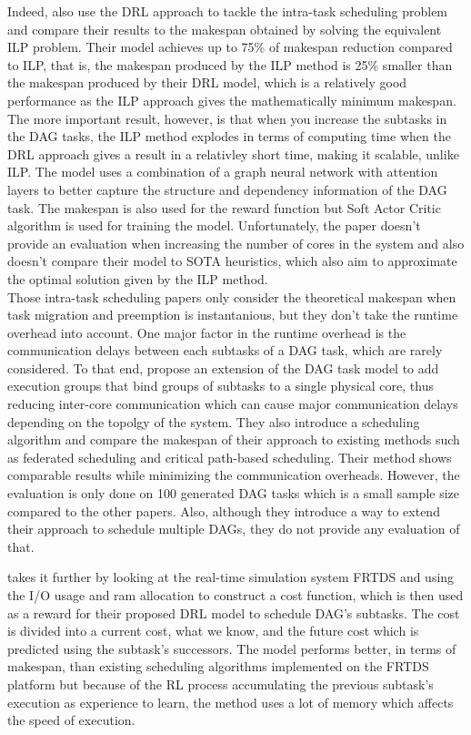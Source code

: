 Indeed, \cite{Zhao2024GATDRLmodel} also 
use the DRL approach to tackle the intra-task scheduling 
problem and compare their results to the makespan
obtained by solving the equivalent ILP problem.
Their model achieves up to 75\% of makespan 
reduction compared to ILP, that is, the makespan 
produced by the ILP method is 25\% smaller than the 
makespan produced by their DRL model,
which is a relatively good performance as 
the ILP approach gives the mathematically minimum makespan.
The more important result, however,
is that when you increase the subtasks in the DAG tasks,
the ILP method explodes in terms of computing
time when the DRL approach gives a result in a relativley short time,
making it scalable, unlike ILP.
The model uses a combination of a graph neural network 
with attention layers to better capture 
the structure and dependency information of the DAG task.
The makespan is also used for the reward function but 
Soft Actor Critic algorithm is used for training the model. 
Unfortunately, the paper doesn't provide 
an evaluation when increasing the number of cores 
in the system and also doesn't compare their model 
to SOTA heuristics, which also aim to approximate 
the optimal solution given by the ILP method.\\

Those intra-task scheduling papers only consider the theoretical
makespan when task migration and preemption 
is instantanious, but they don't take the runtime overhead into account.
One major factor in the runtime overhead is the communication 
delays between each subtasks of a DAG task, which are rarely considered.
To that end, \cite{Shi2024DagExecGroups}
propose an extension of the DAG task model to add 
execution groups that bind groups of subtasks
to a single physical core, thus reducing 
inter-core communication which can cause major
communication delays depending on the topolgy of the system.
They also introduce a scheduling algorithm 
and compare the makespan of their approach to existing methods
such as federated scheduling and critical path-based scheduling.
Their method shows comparable results while minimizing 
the communication overheads.
However, the evaluation is only done on 100 generated 
DAG tasks which is a small sample size compared to the other papers\cite{Zhao2022DAGsched}\cite{He2019DagIntra}.
Also, although they introduce a way to extend their approach to schedule
multiple DAGs, they do not provide any evaluation of that.

\cite{GuanFRTDS2020RL} takes it further by looking 
at the real-time simulation system FRTDS
and using the I/O usage and ram allocation to construct a cost 
function, which is then used as a reward for their proposed
DRL model to schedule DAG's subtasks.
The cost is divided into a current cost, what we know,
and the future cost which is predicted using the subtask's successors.
The model performs better, in terms of makespan, than 
existing scheduling algorithms implemented on the FRTDS platform 
but because of the RL process accumulating the previous subtask's
execution as experience to learn, the method uses a lot of memory
which affects the speed of execution.


